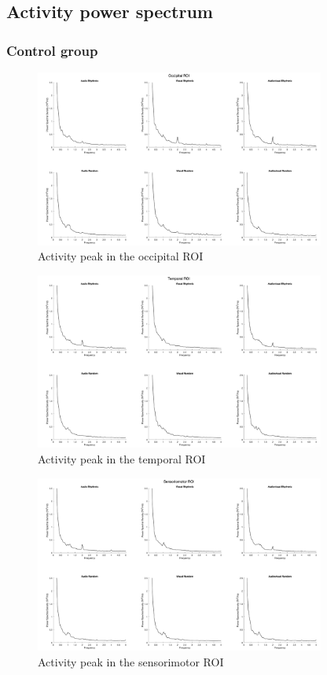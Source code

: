 \clearpage
\subsection*{Activity power spectrum}
\subsubsection*{Control group}
\begin{figure}[H]
    \centering
    \includegraphics[width=0.85\textwidth]{healthy_images/occipitalROI_graph.png}
    \caption{Activity peak in the occipital ROI}
    \label{fig: occipital ROI: control}
\end{figure}
\begin{figure}[H]
    \centering
    \includegraphics[width=0.85\textwidth]{healthy_images/temporalROI_graph.png}
    \caption{Activity peak in the temporal ROI}
    \label{fig: temporal ROI: control}
\end{figure}
\begin{figure}[H]
    \centering
    \includegraphics[width=0.85\textwidth]{healthy_images/sensorimotorROI_graph.png}
    \caption{Activity peak in the sensorimotor ROI}
    \label{fig: sensorimotor ROI: control} 
\end{figure} 

